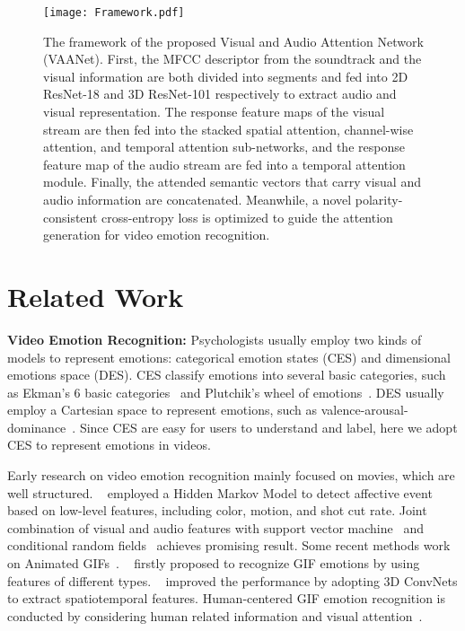 \documentclass[letterpaper]{article} \usepackage{aaai20}  \usepackage{times}  \usepackage{helvet} \usepackage{courier}  \usepackage[hyphens]{url}  \usepackage{graphicx} \urlstyle{rm} \def\UrlFont{\rm}  \usepackage{graphicx}
\begin{document}
\begin{figure*}[!t]
\begin{center}
\centering \texttt{[image: Framework.pdf]}
\caption{The framework of the proposed Visual and Audio Attention Network (VAANet). First, the MFCC descriptor from the soundtrack and the visual information are both divided into segments and fed into 2D ResNet-18 and 3D ResNet-101 respectively to extract audio and visual representation. The response feature maps of the visual stream are then fed into the stacked spatial attention, channel-wise attention, and temporal attention sub-networks, and the response feature map of the audio stream are fed into a temporal attention module. Finally, the attended semantic vectors that carry visual and audio information are concatenated. Meanwhile, a novel polarity-consistent cross-entropy loss is optimized to guide the attention generation for video emotion recognition.}


\label{fig:Framework}
\end{center}
\end{figure*}



\section{Related Work}
\label{sec:RelatedWork}

\noindent\textbf{Video Emotion Recognition:} Psychologists usually employ two kinds of models to represent emotions: categorical emotion states (CES) and dimensional emotions space (DES). CES classify emotions into several basic categories, such as Ekman's 6 basic categories~\cite{ekman1992argument} and Plutchik's wheel of emotions~\cite{plutchik1980emotion}. DES usually employ a Cartesian space to represent emotions, such as valence-arousal-dominance~\cite{schlosberg1954three}. Since CES are easy for users to understand and label, here we adopt CES to represent emotions in videos.

Early research on video emotion recognition mainly focused on movies, which are well structured. \citeauthor{kang2003affective}~ employed a Hidden Markov Model to detect affective event based on low-level features, including color, motion, and shot cut rate. Joint combination of visual and audio features with support vector machine~\cite{wang2006affective} and conditional random fields~\cite{xu2013hierarchical} achieves promising result. Some recent methods work on Animated GIFs~\cite{jou2014predicting,chen2016predicting,yang2019human}. \citeauthor{jou2014predicting}~ firstly proposed to recognize GIF emotions by using features of different types. \citeauthor{chen2016predicting}~ improved the performance by adopting 3D ConvNets to extract spatiotemporal features. Human-centered GIF emotion recognition is conducted by considering human related information and visual attention~\cite{yang2019human}.
\end{document}
